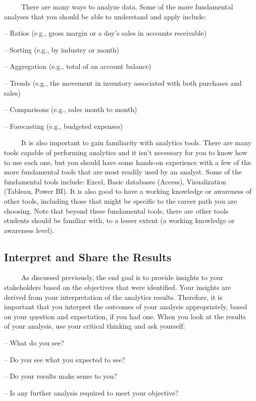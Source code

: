 \documentclass[
  letterpaper,
  DIV=11,
  numbers=noendperiod]{scrreprt}
\begin{document}
~~~~~There are many ways to analyze data. Some of the more fundamental
analyses that you should be able to understand and apply include:

-- Ratios (e.g., gross margin or a day's sales in accounts receivable)

-- Sorting (e.g., by industry or month)

-- Aggregation (e.g., total of an account balance)

-- Trends (e.g., the movement in inventory associated with both
purchases and sales)

-- Comparisons (e.g., sales month to month)

-- Forecasting (e.g., budgeted expenses)

~~~~~It is also important to gain familiarity with analytics tools.
There are many tools capable of performing analytics and it isn't
necessary for you to know how to use each one, but you should have some
hands-on experience with a few of the more fundamental tools that are
most readily used by an analyst. Some of the fundamental tools include:
Excel, Basic databases (Access), Visualization (Tableau, Power BI). It
is also good to have a working knowledge or awareness of other tools,
including those that might be specific to the career path you are
choosing. Note that beyond these fundamental tools, there are other
tools students should be familiar with, to a lesser extent (a working
knowledge or awareness level).

\subsection{Interpret and Share the
Results}\label{interpret-and-share-the-results}

~~~~~As discussed previously, the end goal is to provide insights to
your stakeholders based on the objectives that were identified. Your
insights are derived from your interpretation of the analytics results.
Therefore, it is important that you interpret the outcomes of your
analysis appropriately, based on your question and expectation, if you
had one. When you look at the results of your analysis, use your
critical thinking and ask yourself:

-- What do you see?

-- Do you see what you expected to see?

-- Do your results make sense to you?

-- Is any further analysis required to meet your objective?
\end{document}
